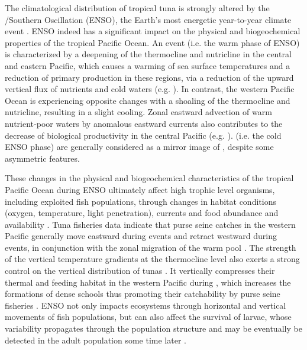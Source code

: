 The climatological distribution of tropical tuna is strongly altered by the \nino{}/Southern Oscillation (ENSO), the Earth’s most energetic year-to-year climate event \citep{williamsOverviewTunaFisheries2014, caiChangingNinoSouthern2021}. ENSO indeed has a significant impact on the physical and biogeochemical properties of the tropical Pacific Ocean. 
An \nino{} event (i.e. the warm phase of ENSO) is characterized by a  deepening of the thermocline and nutricline in the central and eastern Pacific, which causes a warming of sea surface temperatures and a reduction of primary production in these regions, via a reduction of the upward vertical flux of nutrients and cold waters (e.g. \citealp{chavezBiologicalChemicalResponse1999, murtuguddeOceanColorVariability1999}). In contrast, the western Pacific Ocean is experiencing opposite changes with a shoaling of the thermocline and nutricline, resulting in a slight cooling. Zonal eastward advection of warm nutrient‐poor waters by anomalous eastward currents also contributes to the decrease of biological productivity in the central Pacific (e.g. \citealp{chavezBiologicalChemicalResponse1999, picautOceanicZoneConvergence2001}). \nina{} (i.e. the cold ENSO phase) are generally considered as a mirror image of \nino{}, despite some asymmetric features.  

These changes in the physical and biogeochemical characteristics of the tropical Pacific Ocean during ENSO ultimately affect high trophic level organisms, including exploited fish populations, through changes in habitat conditions (oxygen, temperature, light penetration), currents and food abundance and availability \citep{bertrandNinoSouthernOscillation2020}.  Tuna fisheries data indicate that purse seine catches in the western Pacific generally move eastward during \nino{} events and retract  westward during \nina{} events, in conjunction with the zonal migration of the warm pool \citep{lehodeyNinoSouthernOscillation1997}. The strength of the vertical temperature gradients at the thermocline level also exerts a strong control on the vertical distribution of tunas \citep[e.g.][]{schaeferMovementsBehaviorHabitat2002}. It vertically compresses their thermal and feeding habitat in the western Pacific during \nino{}, which increases the formations of dense schools \citep{mauryCanSchoolingRegulate2017} thus promoting their catchability by purse seine fisheries \citep{bertrandHydrologicalTrophicCharacteristics2002}. ENSO not only impacts ecosystems through horizontal and vertical movements of fish populations, but can also affect the survival of larvae, whose variability propagates through the population structure and may be eventually be detected in the adult population some time later \citep{yenSpatialTemporalVariations2016, kimEffectsClimateinducedVariation2015}. 

